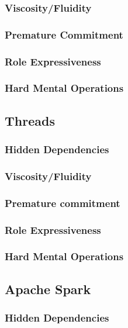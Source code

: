 \documentclass{sig-alternate}
\begin{document}
\subsubsection{Viscosity/Fluidity}

\subsubsection{Premature Commitment}

\subsubsection{Role Expressiveness}

\subsubsection{Hard Mental Operations}

\subsection{Threads}
\subsubsection{Hidden Dependencies}

\subsubsection{Viscosity/Fluidity}

\subsubsection{Premature commitment}

\subsubsection{Role Expressiveness}

\subsubsection{Hard Mental Operations}

\subsection{Apache Spark}
\subsubsection{Hidden Dependencies}
\end{document}
